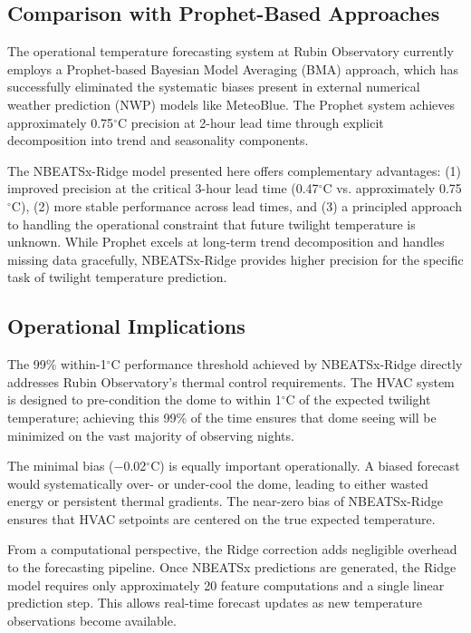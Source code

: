 \documentclass[11pt]{article}
\begin{document}
\subsection{Comparison with Prophet-Based Approaches}

The operational temperature forecasting system at Rubin Observatory currently employs a Prophet-based Bayesian Model Averaging (BMA) approach, which has successfully eliminated the systematic biases present in external numerical weather prediction (NWP) models like MeteoBlue. The Prophet system achieves approximately 0.75$^\circ$C precision at 2-hour lead time through explicit decomposition into trend and seasonality components.

The NBEATSx-Ridge model presented here offers complementary advantages: (1) improved precision at the critical 3-hour lead time (0.47$^\circ$C vs. approximately 0.75$^\circ$C), (2) more stable performance across lead times, and (3) a principled approach to handling the operational constraint that future twilight temperature is unknown. While Prophet excels at long-term trend decomposition and handles missing data gracefully, NBEATSx-Ridge provides higher precision for the specific task of twilight temperature prediction.

\subsection{Operational Implications}

The 99\% within-1$^\circ$C performance threshold achieved by NBEATSx-Ridge directly addresses Rubin Observatory's thermal control requirements. The HVAC system is designed to pre-condition the dome to within 1$^\circ$C of the expected twilight temperature; achieving this 99\% of the time ensures that dome seeing will be minimized on the vast majority of observing nights.

The minimal bias ($-$0.02$^\circ$C) is equally important operationally. A biased forecast would systematically over- or under-cool the dome, leading to either wasted energy or persistent thermal gradients. The near-zero bias of NBEATSx-Ridge ensures that HVAC setpoints are centered on the true expected temperature.

From a computational perspective, the Ridge correction adds negligible overhead to the forecasting pipeline. Once NBEATSx predictions are generated, the Ridge model requires only approximately 20 feature computations and a single linear prediction step. This allows real-time forecast updates as new temperature observations become available.
\end{document}
